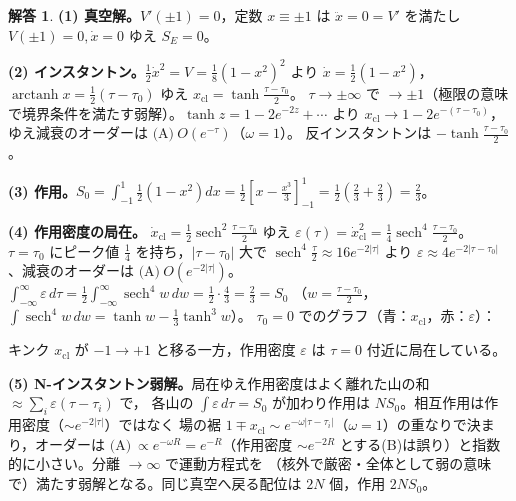 \documentclass[dvipdfmx, uplatex]{jsarticle}
\newcommand{\sech}{\operatorname{sech}}
\theoremstyle{definition}
\newtheorem*{sol}{解答}
\begin{document}
\begin{sol}
\textbf{(1) 真空解。}$V'(\pm1)=0$，定数 $x\equiv\pm1$ は $\ddot x=0=V'$ を満たし $V(\pm1)=0,\dot x=0$ ゆえ $S_E=0$。

\textbf{(2) インスタントン。}$\tfrac12\dot x^2=V=\tfrac18(1-x^2)^2$ より $\dot x=\tfrac12(1-x^2)$，
$\operatorname{arctanh}x=\tfrac12(\tau-\tau_0)$ ゆえ $\boxed{x_{\mathrm{cl}}=\tanh\tfrac{\tau-\tau_0}{2}}$。
$\tau\to\pm\infty$ で $\to\pm1$（極限の意味で境界条件を満たす弱解）。$\tanh z=1-2e^{-2z}+\cdots$ より
$x_{\mathrm{cl}}\to1-2e^{-(\tau-\tau_0)}$，ゆえ減衰のオーダーは $\boxed{\text{(A)}\ O(e^{-\tau})}$（$\omega=1$）。
反インスタントンは $-\tanh\tfrac{\tau-\tau_0}{2}$。

\textbf{(3) 作用。}$S_0=\int_{-1}^{1}\tfrac12(1-x^2)dx=\tfrac12[x-\tfrac{x^3}3]_{-1}^1=\tfrac12(\tfrac23+\tfrac23)=\boxed{\tfrac23}$。

\textbf{(4) 作用密度の局在。}
$\dot x_{\mathrm{cl}}=\tfrac12\sech^2\tfrac{\tau-\tau_0}{2}$ ゆえ
$\boxed{\varepsilon(\tau)=\dot x_{\mathrm{cl}}^2=\tfrac14\sech^4\tfrac{\tau-\tau_0}{2}}$。
$\tau=\tau_0$ にピーク値 $\boxed{\tfrac14}$ を持ち，$|\tau-\tau_0|$ 大で $\sech^4\tfrac{\tau}{2}\approx16e^{-2|\tau|}$ より
$\varepsilon\approx4e^{-2|\tau-\tau_0|}$、減衰のオーダーは $\boxed{\text{(A)}\ O(e^{-2|\tau|})}$。
$\int_{-\infty}^{\infty}\varepsilon\,d\tau=\tfrac12\int_{-\infty}^\infty\sech^4w\,dw=\tfrac12\cdot\tfrac43=\tfrac23=S_0$
（$w=\tfrac{\tau-\tau_0}2$，$\int\sech^4w\,dw=\tanh w-\tfrac13\tanh^3w$）。
$\tau_0=0$ でのグラフ（青：$x_{\mathrm{cl}}$，赤：$\varepsilon$）：

\begin{center}
\end{center}
キンク $x_{\mathrm{cl}}$ が $-1\to+1$ と移る一方，作用密度 $\varepsilon$ は $\tau=0$ 付近に局在している。

\textbf{(5) N-インスタントン弱解。}局在ゆえ作用密度はよく離れた山の和 $\approx\sum_i\varepsilon(\tau-\tau_i)$ で，
各山の $\int\varepsilon\,d\tau=S_0$ が加わり作用は $\boxed{NS_0}$。相互作用は作用密度（$\sim e^{-2|\tau|}$）ではなく
場の裾 $1\mp x_{\mathrm{cl}}\sim e^{-\omega|\tau-\tau_i|}$（$\omega=1$）の重なりで決まり，オーダーは
$\boxed{\text{(A)}\ \propto e^{-\omega R}=e^{-R}}$（作用密度 $\sim e^{-2R}$ とする(B)は誤り）と指数的に小さい。分離 $\to\infty$ で運動方程式を
（核外で厳密・全体として弱の意味で）満たす弱解となる。同じ真空へ戻る配位は $2N$ 個，作用 $2NS_0$。
\end{sol}
\end{document}
